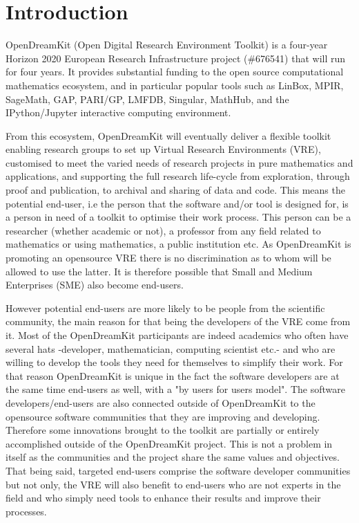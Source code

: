 \documentclass{deliverablereport}
\author{Nicolas M. Thiéry, Benoît Pilorget}
\begin{document}
\enlargethispage{4ex}
\maketitle
\githubissuedescription
\tableofcontents\newpage


\section{Introduction}

OpenDreamKit (Open Digital Research Environment Toolkit) is a four-year Horizon 2020 European Research Infrastructure project (\#676541) that will run for four years. It provides substantial funding to the open source computational mathematics ecosystem, and in particular popular tools such as LinBox, MPIR, SageMath, GAP, PARI/GP, LMFDB, Singular, MathHub, and the IPython/Jupyter interactive computing environment.

From this ecosystem, OpenDreamKit will eventually deliver a flexible toolkit enabling research groups to set up Virtual Research Environments (VRE), customised to meet the varied needs of research projects in pure mathematics and applications, and supporting the full research life-cycle from exploration, through proof and publication, to archival and sharing of data and code. 
This means the potential end-user, i.e the person that the software and/or tool is designed for, is a person in need of a toolkit to optimise their work process. This person can be a researcher (whether academic or not), a professor from any field related to mathematics or using mathematics, a public institution etc. As OpenDreamKit is promoting an opensource VRE there is no discrimination as to whom will be allowed to use the latter. It is therefore possible that Small and Medium Enterprises (SME) also become end-users.

However potential end-users are more likely to be people from the scientific community, the main reason for that being the developers of the VRE come from it. Most of the OpenDreamKit participants are indeed academics who often have several hats -developer, mathematician, computing scientist etc.- and who are willing to develop the tools they need for themselves to simplify their work. For that reason OpenDreamKit is unique in the fact the software developers are at the same time end-users as well, with a "by users for users model". The software developers/end-users are also connected outside of OpenDreamKit to the opensource software communities that they are improving and developing. Therefore some innovations brought to the toolkit are partially or entirely accomplished outside of the OpenDreamKit project. This is not a problem in itself as the communities and the project share the same values and objectives.
That being said, targeted end-users comprise the software developer communities but not only, the VRE will also benefit to end-users who are not experts in the field and who simply need tools to enhance their results and improve their processes.
\end{document}
